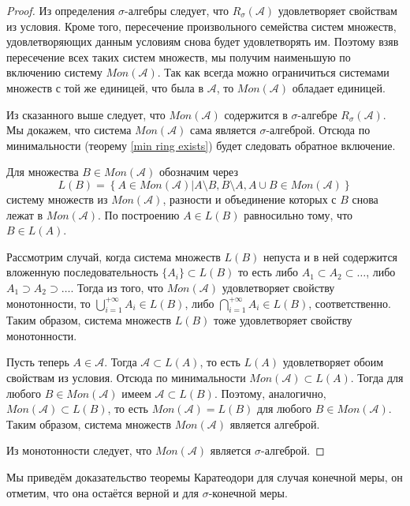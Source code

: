 \documentclass[12pt]{article}
\numberwithin{theorem}{section}
\theoremstyle{definition}
\newcommand{\calA}{\mathcal{A}}
\newcommand{\defineset}[2]{\left\{
	\left.
	#1
	\right\vert
	#2
	\right\}}
\begin{document}
	\begin{proof}
		Из определения $ \sigma $-алгебры следует, что $ R_{\sigma}(\calA) $ удовлетворяет свойствам из условия.
		Кроме того, пересечение произвольного семейства систем множеств, удовлетворяющих данным условиям
		снова будет удовлетворять им. Поэтому взяв пересечение всех таких систем множеств,
		мы получим наименьшую по включению систему $ Mon(\calA) $.
		Так как всегда можно ограничиться системами множеств с той же единицей, что была в $ \calA $,
		то $ Mon(\calA) $ обладает единицей.
		
		Из сказанного выше следует, что $ Mon(\calA) $ содержится в $ \sigma $-алгебре $ R_{\sigma}(\calA) $.
		Мы докажем, что система $ Mon(\calA) $ сама является $ \sigma $-алгеброй.
		Отсюда по минимальности (теорему \ref{min ring exists}) будет следовать обратное включение.
		
		Для множества $ B \in Mon(\calA) $ обозначим через 
		$$ L(B) 
		= \defineset
		{A \in Mon(\calA)}
		{A \setminus B, B \setminus A, A \cup B \in Mon(\calA)} $$ 
		систему множеств из $ Mon(\calA) $, 
		разности и объединение которых с $ B $ снова лежат в $ Mon(\calA) $.
		По построению $ A \in L(B) $ равносильно тому, что $ B \in L(A) $.
		
		Рассмотрим случай, когда система множеств $ L(B) $ непуста и в ней 
		содержится вложенную последовательность $ \{A_i\} \subset L(B) $
		то есть либо $ A_1 \subset A_2 \subset \ldots $, либо $ A_1 \supset A_2 \supset \ldots $.
		Тогда из того, что $ Mon(\calA) $ удовлетворяет свойству монотонности,
		то $ \bigcup\limits_{i = 1}^{+\infty} A_i \in L(B) $,
		либо $ \bigcap\limits_{i = 1}^{+\infty} A_i \in L(B) $, соответственно.
		Таким образом, система множеств $ L(B) $ тоже удовлетворяет свойству монотонности.
		
		Пусть теперь $ A \in \calA $. Тогда $ \calA \subset L(A) $, то есть $ L(A) $ удовлетворяет обоим свойствам из условия. 
		Отсюда по минимальности $ Mon(\calA) \subset L(A) $.
		Тогда для любого $ B \in Mon(\calA) $ имеем $ \calA \subset L(B) $.
		Поэтому, аналогично, $ Mon(\calA) \subset L(B) $,
		то есть $ Mon(\calA) = L(B) $ для любого $ B \in Mon(\calA) $.
		Таким образом, система множеств $ Mon(\calA) $ является алгеброй.
		
		Из монотонности следует, что $ Mon(\calA) $ является $ \sigma $-алгеброй.
	\end{proof}
	
	Мы приведём доказательство теоремы Каратеодори для случая конечной меры, он отметим, 
	что она остаётся верной и для $ \sigma $-конечной меры.
	
\end{document}

